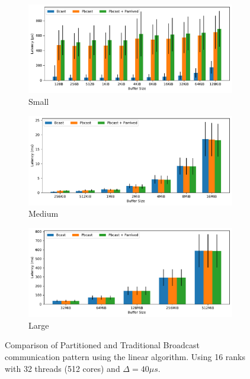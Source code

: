\documentclass{article}
\begin{document}
  \begin{figure}[h]
    \centering
    \begin{subfigure}[b]{0.44\textwidth}
      \centering
      \includegraphics[width=\textwidth]{data-linear-bcast-tree/small.pdf}
      \caption{Small}
    \end{subfigure}

    \begin{subfigure}[b]{0.44\textwidth}
      \centering
      \includegraphics[width=\textwidth]{data-linear-bcast-tree/med.pdf}
      \caption{Medium}
    \end{subfigure}
    \hfill

    \begin{subfigure}[b]{0.44\textwidth}
      \centering
      \includegraphics[width=\textwidth]{data-linear-bcast-tree/large.pdf}
      \caption{Large}
    \end{subfigure}
    \caption{Comparison of Partitioned and Traditional Broadcast communication
             pattern using the linear algorithm. Using 16 ranks with 32 threads
             (512 cores) and $\Delta = 40\mu s$.}
  \end{figure}
\end{document}
